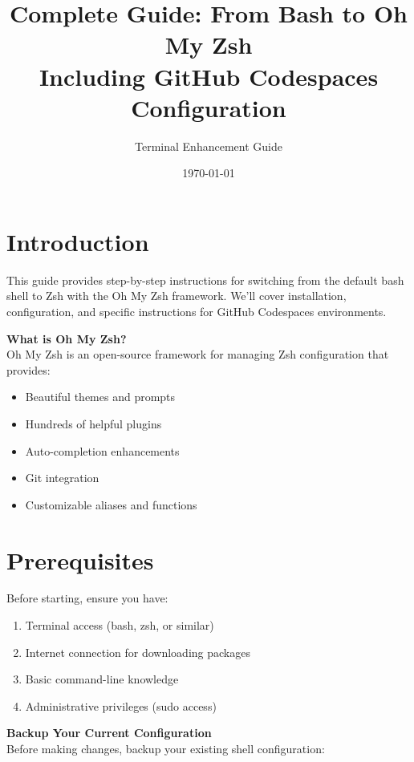 \documentclass{article}
\title{Complete Guide: From Bash to Oh My Zsh\\
\large Including GitHub Codespaces Configuration}
\author{Terminal Enhancement Guide}
\date{\today}
\begin{document}
\maketitle

\tableofcontents
\newpage

\section{Introduction}

This guide provides step-by-step instructions for switching from the default bash shell to Zsh with the Oh My Zsh framework. We'll cover installation, configuration, and specific instructions for GitHub Codespaces environments.

\begin{infobox}
\textbf{What is Oh My Zsh?}\\
Oh My Zsh is an open-source framework for managing Zsh configuration that provides:
\begin{itemize}
    \item Beautiful themes and prompts
    \item Hundreds of helpful plugins
    \item Auto-completion enhancements
    \item Git integration
    \item Customizable aliases and functions
\end{itemize}
\end{infobox}

\section{Prerequisites}

Before starting, ensure you have:

\begin{enumerate}
    \item Terminal access (bash, zsh, or similar)
    \item Internet connection for downloading packages
    \item Basic command-line knowledge
    \item Administrative privileges (sudo access)
\end{enumerate}

\begin{warningbox}
\textbf{Backup Your Current Configuration}\\
Before making changes, backup your existing shell configuration:
\end{warningbox}
\end{document}
